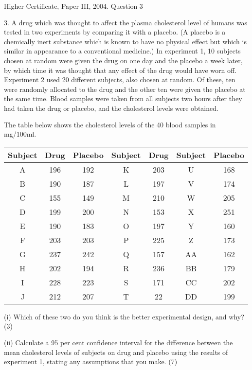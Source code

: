 \documentclass[a4paper,12pt]{article}
\begin{document}
Higher Certificate, Paper III, 2004.  Question 3 
\begin{framed}
 
 3. A drug which was thought to affect the plasma cholesterol level of humans was tested in two experiments by comparing it with a placebo.  (A placebo is a chemically inert substance which is known to have no physical effect but which is similar in appearance to a conventional medicine.)  In experiment 1, 10 subjects chosen at random were given the drug on one day and the placebo a week later, by which time it was thought that any effect of the drug would have worn off.  Experiment 2 used 20 different subjects, also chosen at random.  Of these, ten were randomly allocated to the drug and the other ten were given the placebo at the same time.  Blood samples were taken from all subjects two hours after they had taken the drug or placebo, and the cholesterol levels were obtained. 
 
The table below shows the cholesterol levels of the 40 blood samples in mg/100ml. 
 
\begin{center}
\begin{tabular}{ccccccc}
Subject	&	Drug	&	Placebo	&	Subject	&	Drug	&	Subject	&	Placebo	\\ \hline 
A	&	196	&	192	&	K	&	203	&	U	&	168	\\ \hline 
B	&	190	&	187	&	L	&	197	&	V	&	174	\\ \hline 
C	&	155	&	149	&	M	&	210	&	W	&	205	\\ \hline 
D	&	199	&	200	&	N	&	153	&	X	&	251	\\ \hline 
E	&	190	&	183	&	O	&	197	&	Y	&	160	\\ \hline 
F	&	203	&	203	&	P	&	225	&	Z	&	173	\\ \hline 
G	&	237	&	242	&	Q	&	157	&	AA	&	162	\\ \hline 
H	&	202	&	194	&	R	&	236	&	BB	&	179	\\ \hline 
I	&	228	&	223	&	S	&	171	&	CC	&	202	\\ \hline 
J	&	212	&	207	&	T	&	22	&	DD	&	199	\\ \hline 
\end{tabular}
\end{center}
 
(i) Which of these two do you think is the better experimental design, and why? (3) 
 
(ii) Calculate a 95 per cent confidence interval for the difference between the mean cholesterol levels of subjects on drug and placebo using the results of experiment 1, stating any assumptions that you make. (7) 
\end{framed}
\end{document}
